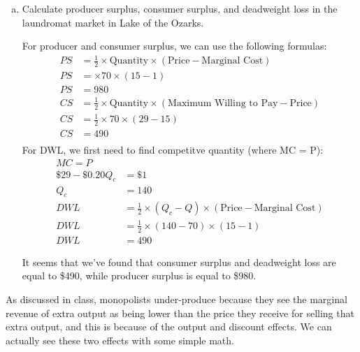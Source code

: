 \documentclass{article}
\begin{document}
\begin{enumerate}[(a)]
    \item Calculate producer surplus, consumer surplus, and deadweight loss in the laundromat market in Lake of the Ozarks.
    
    For producer and consumer surplus, we can use the following formulas:
    \begin{align*}
        PS &= \frac{1}2 \times \text{Quantity} \times (\text{Price} - \text{Marginal Cost}) \\
        PS &= \times 70 \times (15 - 1) \\
        PS &= 980 \\
        CS &= \frac{1}2 \times \text{Quantity} \times (\text{Maximum Willing to Pay} - \text{Price}) \\
        CS &= \frac{1}{2} \times 70 \times (29 - 15) \\
        CS &= 490 \\
    \end{align*}
    For DWL, we first need to find competitve quantity (where MC = P):
    \begin{align*}
        MC = P \\
        \$29 - \$0.20Q_c &= \$1 \\
        Q_c &= 140 \\
        DWL &= \frac{1}{2} \times (Q_c - Q) \times (\text{Price} - \text{Marginal Cost}) \\
        DWL &= \frac{1}{2} \times (140 - 70) \times (15 - 1) \\
        DWL &= 490
    \end{align*}

    It seems that we've found that consumer surplus and deadweight loss are equal to \$490, while producer surplus is equal to \$980.

\end{enumerate}

As discussed in class, monopolists under-produce because they see the
marginal revenue of extra output as being lower than the price they
receive for selling that extra output, and this is because of the output
and discount effects. We can actually see these two effects with some
simple math.
\end{document}
